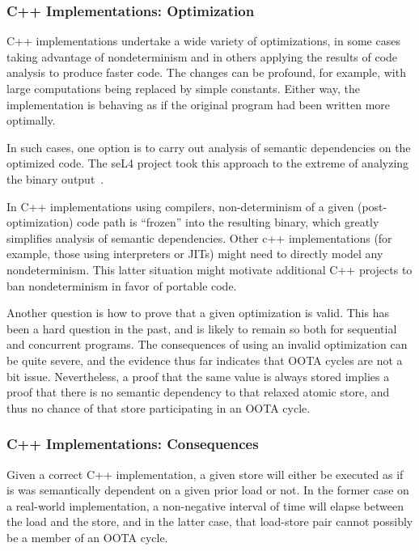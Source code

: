 \documentclass[10]{article}
\begin{document}
\subsubsection{C++ Implementations: Optimization}
\label{sec:C++ Implementations: Optimization}

C++ implementations undertake a wide variety of optimizations, in
some cases taking advantage of nondeterminism and in others applying
the results of code analysis to produce faster code.
The changes can be profound, for example, with large computations being
replaced by simple constants.
Either way, the implementation is behaving as if the original program
had been written more optimally.

In such cases, one option is to carry out analysis of semantic dependencies
on the optimized code.
The seL4 project took this approach to the extreme of analyzing
the binary output~\cite{ThomasSewell2013L4binaryVerification}.

In C++ implementations using compilers, non-determinism of a given
(post-optimization) code path is ``frozen'' into the resulting binary,
which greatly simplifies analysis of semantic dependencies.
Other c++ implementations (for example, those using interpreters or JITs)
might need to directly model any nondeterminism.
This latter situation might motivate additional C++ projects to ban
nondeterminism in favor of portable code.

Another question is how to prove that a given optimization is valid.
This has been a hard question in the past, and is likely to remain so
both for sequential and concurrent programs.
The consequences of using an invalid optimization can be quite severe,
and the evidence thus far indicates that OOTA cycles are not a bit issue.
Nevertheless, a proof that the same value is always stored implies a
proof that there is no semantic dependency to that relaxed atomic store,
and thus no chance of that store participating in an OOTA cycle.

\subsubsection{C++ Implementations: Consequences}
\label{sec:C++ Implementations: Consequences}

Given a correct C++ implementation, a given store will either be
executed as if is was semantically dependent on a given prior load or
not.
In the former case on a real-world implementation, a non-negative interval
of time will elapse between the load and the store, and in the latter
case, that load-store pair cannot possibly be a member of an OOTA cycle.
\end{document}
